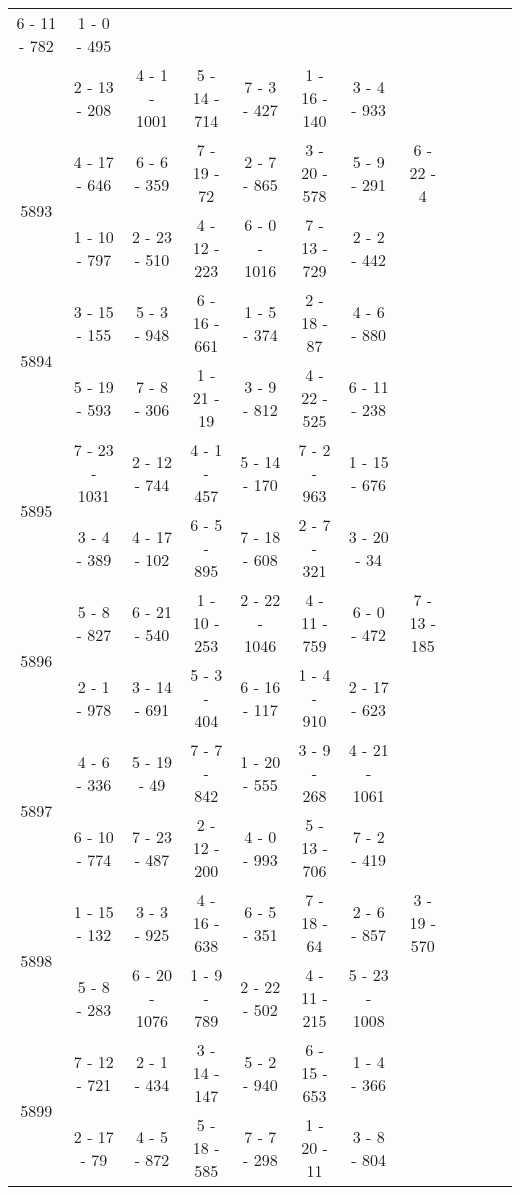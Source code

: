 \begin{longtable}{c | c | c | c | c | c | c | c | c | c | c | c}
6 - 11 - 782
&
1 - 0 - 495
&\space\\* \space
&
2 - 13 - 208
&
4 - 1 - 1001
&
5 - 14 - 714
&
7 - 3 - 427
&
1 - 16 - 140
&
3 - 4 - 933
&\space\\\hline
\multirow{2}{*}{5893}
& 4 - 17 - 646
&
6 - 6 - 359
&
7 - 19 - 72
&
2 - 7 - 865
&
3 - 20 - 578
&
5 - 9 - 291
&
6 - 22 - 4
\\* \space
&
1 - 10 - 797
&
2 - 23 - 510
&
4 - 12 - 223
&
6 - 0 - 1016
&
7 - 13 - 729
&
2 - 2 - 442
&\space\\\hline
\multirow{2}{*}{5894}
& 3 - 15 - 155
&
5 - 3 - 948
&
6 - 16 - 661
&
1 - 5 - 374
&
2 - 18 - 87
&
4 - 6 - 880
&\space\\* \space
&
5 - 19 - 593
&
7 - 8 - 306
&
1 - 21 - 19
&
3 - 9 - 812
&
4 - 22 - 525
&
6 - 11 - 238
&\space\\\hline
\multirow{2}{*}{5895}
& 7 - 23 - 1031
&
2 - 12 - 744
&
4 - 1 - 457
&
5 - 14 - 170
&
7 - 2 - 963
&
1 - 15 - 676
&\space\\* \space
&
3 - 4 - 389
&
4 - 17 - 102
&

6 - 5 - 895
&
7 - 18 - 608
&
2 - 7 - 321
&
3 - 20 - 34
&\space\\\hline
\multirow{2}{*}{5896}
& 5 - 8 - 827
&
6 - 21 - 540
&
1 - 10 - 253
&
2 - 22 - 1046
&
4 - 11 - 759
&
6 - 0 - 472
&
7 - 13 - 185
\\* \space
&
2 - 1 - 978
&
3 - 14 - 691
&
5 - 3 - 404
&
6 - 16 - 117
&
1 - 4 - 910
&
2 - 17 - 623
&\space\\\hline
\multirow{2}{*}{5897}
& 4 - 6 - 336
&
5 - 19 - 49
&
7 - 7 - 842
&
1 - 20 - 555
&
3 - 9 - 268
&
4 - 21 - 1061
&\space\\* \space
&
6 - 10 - 774
&
7 - 23 - 487
&
2 - 12 - 200
&
4 - 0 - 993
&
5 - 13 - 706
&
7 - 2 - 419
&\space\\\hline
\multirow{2}{*}{5898}
& 1 - 15 - 132
&
3 - 3 - 925
&
4 - 16 - 638
&
6 - 5 - 351
&
7 - 18 - 64
&
2 - 6 - 857
&
3 - 19 - 570
\\* \space
&
5 - 8 - 283
&
6 - 20 - 1076
&
1 - 9 - 789
&
2 - 22 - 502
&
4 - 11 - 215
&
5 - 23 - 1008
&\space\\\hline
\multirow{2}{*}{5899}
& 7 - 12 - 721
&
2 - 1 - 434
&
3 - 14 - 147
&
5 - 2 - 940
&
6 - 15 - 653
&
1 - 4 - 366
&\space\\* \space
&
2 - 17 - 79
&
4 - 5 - 872
&
5 - 18 - 585
&
7 - 7 - 298
&
1 - 20 - 11
&
3 - 8 - 804
&\space\\\hline
\end{longtable}



